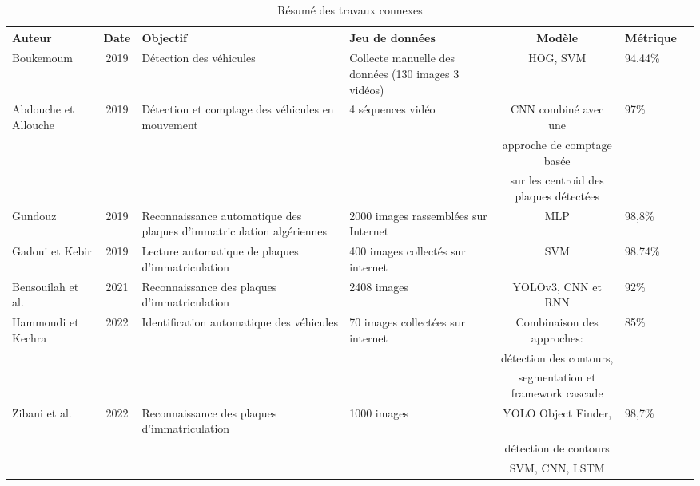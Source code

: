 \begin{table}[h]
\centering
\scriptsize
\begin{tabular}{|p{1.5cm}|c|p{3cm}|p{2.5cm}|c|p{1cm}|p{1cm}|}
\hline
Auteur & Date & Objectif & Jeu  de données & Modèle & Métrique \\
\hline
Boukemoum & 2019 & Détection des véhicules  & Collecte manuelle des données (130 images
3 vidéos) & HOG, SVM & 94.44\% \\

\hline
Abdouche  et Allouche  & 2019 & Détection et comptage des véhicules en mouvement & 4 séquences vidéo  & CNN combiné avec une   & 97\% \\
& & & & approche de comptage basée & \\
& & & & sur les centroid des plaques détectées & \\
\hline
Gundouz & 2019 & Reconnaissance automatique des plaques d’immatriculation algériennes & 2000 images rassemblées sur Internet & MLP & 98,8\% \\
\hline
Gadoui et Kebir & 2019 & Lecture automatique de plaques d'immatriculation & 400 images collectés sur internet & SVM & 98.74\% \\

\hline
Bensouilah et al. & 2021  &  Reconnaissance des plaques d'immatriculation  &  2408 images & YOLOv3, CNN et RNN &  92\%\\

\hline
Hammoudi et Kechra  & 2022 & Identification automatique des véhicules & 70 images collectées sur internet & Combinaison des approches:  & 85\% \\
& & & & détection des contours,  & \\
& & & & segmentation et framework cascade & \\

\hline
Zibani et al. & 2022 & Reconnaissance des plaques d'immatriculation & 1000 images & YOLO Object Finder, & 98,7\% \\
& & & & détection de contours  & \\
& & & &  SVM, CNN, LSTM & \\

\hline


\end{tabular}
\caption{Résumé des travaux connexes}
\label{tab:research-summary}
\end{table}


